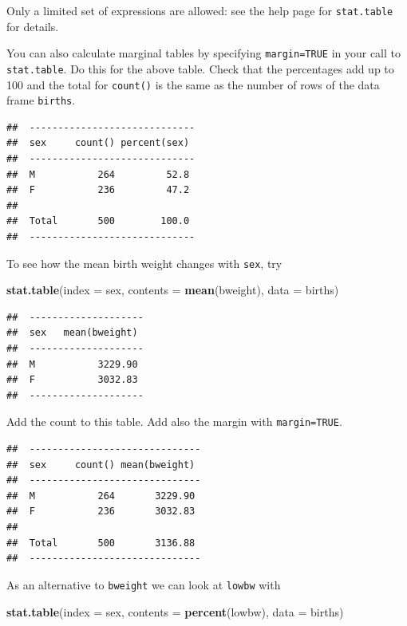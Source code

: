 \documentclass[
]{book}
\newenvironment{Shaded}{\begin{snugshade}}{\end{snugshade}}
\newcommand{\AttributeTok}[1]{\textcolor[rgb]{0.13,0.29,0.53}{#1}}
\newcommand{\FunctionTok}[1]{\textcolor[rgb]{0.13,0.29,0.53}{\textbf{#1}}}
\newcommand{\NormalTok}[1]{#1}
\begin{document}
Only a limited set of expressions are allowed: see the help page
for \texttt{stat.table} for details.

You can also calculate marginal tables by specifying \texttt{margin=TRUE}
in your call to \texttt{stat.table}. Do this for the above table. Check
that the percentages add up to 100 and the total for \texttt{count()} is the
same as the number of rows of the data frame \texttt{births}.

\begin{verbatim}
##  ----------------------------- 
##  sex     count() percent(sex)  
##  ----------------------------- 
##  M           264         52.8  
##  F           236         47.2  
##                                
##  Total       500        100.0  
##  -----------------------------
\end{verbatim}

To see how the mean birth weight changes with \texttt{sex}, try

\begin{Shaded}
\begin{Highlighting}[]
\FunctionTok{stat.table}\NormalTok{(}\AttributeTok{index =}\NormalTok{ sex, }\AttributeTok{contents =} \FunctionTok{mean}\NormalTok{(bweight), }\AttributeTok{data =}\NormalTok{ births)}
\end{Highlighting}
\end{Shaded}

\begin{verbatim}
##  -------------------- 
##  sex   mean(bweight)  
##  -------------------- 
##  M           3229.90  
##  F           3032.83  
##  --------------------
\end{verbatim}

Add the count to this table. Add also the margin with \texttt{margin=TRUE}.

\begin{verbatim}
##  ------------------------------ 
##  sex     count() mean(bweight)  
##  ------------------------------ 
##  M           264       3229.90  
##  F           236       3032.83  
##                                 
##  Total       500       3136.88  
##  ------------------------------
\end{verbatim}

As an alternative to \texttt{bweight} we can look at \texttt{lowbw} with

\begin{Shaded}
\begin{Highlighting}[]
\FunctionTok{stat.table}\NormalTok{(}\AttributeTok{index =}\NormalTok{ sex, }\AttributeTok{contents =} \FunctionTok{percent}\NormalTok{(lowbw), }\AttributeTok{data =}\NormalTok{ births)}
\end{Highlighting}
\end{Shaded}
\end{document}
